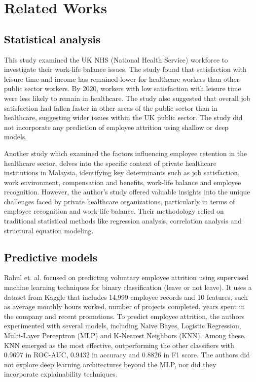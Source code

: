 \documentclass[a4paper,fleqn]{cas-sc}
\begin{document}
\section{Related Works}
\label{sec:related_work}
\subsection{\textcolor{black}{Statistical analysis}}
This study \cite{Ocean2023} examined the UK NHS (National Health Service) workforce to investigate their work-life balance issues. The study found that satisfaction with leisure time and income has remained lower for healthcare workers than other public sector workers. By 2020, workers with low satisfaction with leisure time were less likely to remain in healthcare. The study also suggested that overall job satisfaction had fallen faster in other areas of the public sector than in healthcare, suggesting wider issues within the UK public sector. The study did not incorporate any prediction of employee attrition using shallow or deep models.

Another study \cite{EJHRMS1220} which examined the factors influencing employee retention in the healthcare sector, delves into the specific context of private healthcare institutions in Malaysia, identifying key determinants such as job satisfaction, work environment, compensation and benefits, work-life balance and employee recognition. However, the author’s study offered valuable insights into the unique challenges faced by private healthcare organizations, particularly in terms of employee recognition and work-life balance. Their methodology relied on traditional statistical methods like regression analysis, correlation analysis and structural equation modeling.

\subsection{\textcolor{black}{Predictive models}}
Rahul et. al. \cite{yedida2018employee} focused on predicting voluntary employee attrition using supervised machine learning techniques for binary classification (leave or not leave). It uses a dataset from Kaggle that includes 14,999 employee records and 10 features, such as average monthly hours worked, number of projects completed, years spent in the company and recent promotions. To predict employee attrition, the authors experimented with several models, including Naive Bayes, Logistic Regression, Multi-Layer Perceptron (MLP) and K-Nearest Neighbors (KNN). Among these, KNN emerged as the most effective, outperforming the other classifiers with 0.9697 in  ROC-AUC, 0.9432 in accuracy and 0.8826 in F1 score. The authors did not explore deep learning architectures beyond the MLP, nor did they incorporate explainability techniques.
\end{document}
